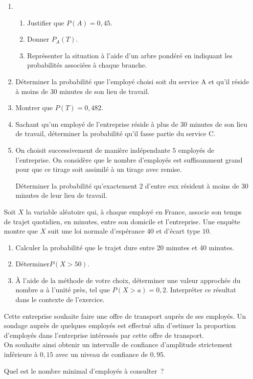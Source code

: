           \begin{enumerate}
               \item
               \begin{enumerate}[label=\alph*.]
                    \item Justifier que $P(A) = 0,45$.
                    \item Donner $P_A(T)$.
                    \item Représenter la situation à l'aide d'un arbre pondéré en indiquant les probabilités associées à chaque branche.
               \end{enumerate}
               \item Déterminer la probabilité que l'employé choisi soit du service A et qu'il réside à moins de $30$ minutes de son lieu de travail.
               \item Montrer que $P(T) = 0,482$.
               \item Sachant qu'un employé de l'entreprise réside à plus de $30$ minutes de son lieu de travail, déterminer la probabilité qu'il fasse partie du service C.
               \item On choisit successivement de manière indépendante $5$ employés de l'entreprise. On considère que le nombre d'employés est suffisamment grand pour que ce tirage soit assimilé à un tirage avec remise. 
               \par
  Déterminer la probabilité qu'exactement $2$ d'entre eux résident à moins de 30 minutes de leur lieu de travail.
          \end{enumerate}
          Soit $X$ la variable aléatoire qui, à chaque employé en France, associe son temps de trajet quotidien, en minutes, entre son domicile et l'entreprise. Une enquête montre que $X$ suit une loi normale d'espérance $40$ et d'écart type $10$.
          \medbreak
          \begin{enumerate}
               \item Calculer la probabilité que le trajet dure entre 20 minutes et 40 minutes.
               \item  Déterminer$P(X > 50)$.
               \item  À l'aide de la méthode de votre choix, déterminer une valeur approchée du nombre $a$ à l'unité près, tel que $P(X > a) = 0,2$. Interpréter ce résultat dans le contexte de l'exercice.
          \end{enumerate}
           Cette entreprise souhaite faire une offre de transport auprès de ses employés. Un sondage auprès de quelques employés est effectué afin d'estimer la proportion d'employés dans l'entreprise intéressés par cette offre de transport. \\On souhaite ainsi obtenir un intervalle de confiance d'amplitude strictement inférieure à $0,15$ avec un niveau de confiance de $0,95$. 
           \par
           Quel est le nombre minimal d'employés à consulter~?

